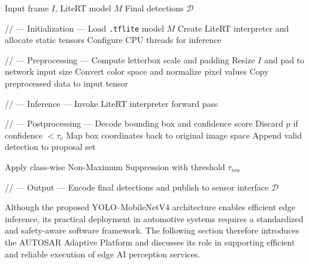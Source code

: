 \begin{algorithm}[ht]
\caption{LiteRT-based YOLO11--MobileNetV4 Inference Pipeline}
\label{alg:litert_yolo_mnv4}
\begin{algorithmic}[1]
\REQUIRE Input frame $I$, LiteRT model $M$
\ENSURE Final detections $\mathcal{D}$

\STATE // --- Initialization ---
\STATE Load \texttt{.tflite} model $M$
\STATE Create LiteRT interpreter and allocate static tensors
\STATE Configure CPU threads for inference

\STATE // --- Preprocessing ---
\STATE Compute letterbox scale and padding
\STATE Resize $I$ and pad to network input size
\STATE Convert color space and normalize pixel values
\STATE Copy preprocessed data to input tensor

\STATE // --- Inference ---
\STATE Invoke LiteRT interpreter forward pass

\STATE // --- Postprocessing ---
    \STATE Decode bounding box and confidence score
    \STATE Discard $p$ if confidence $< \tau_c$
    \STATE Map box coordinates back to original image space
    \STATE Append valid detection to proposal set
\ENDFOR

\STATE Apply class-wise Non-Maximum Suppression with threshold $\tau_{iou}$

\STATE // --- Output ---
\STATE Encode final detections and publish to sensor interface
\RETURN $\mathcal{D}$
\end{algorithmic}
\end{algorithm}

Although the proposed YOLO--MobileNetV4 architecture enables efficient edge inference, its practical deployment in automotive systems requires a standardized and safety-aware software framework. The following section therefore introduces the AUTOSAR Adaptive Platform and discusses its role in supporting efficient and reliable execution of edge AI perception services.



